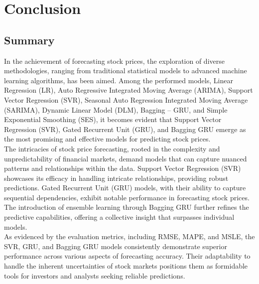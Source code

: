 \documentclass{ieeeojies}
\begin{document}
\section{Conclusion}
\subsection{Summary}
In the achievement of forecasting stock prices, the exploration of diverse methodologies, ranging from traditional statistical models to advanced machine learning algorithms, has been aimed. Among the performed models, Linear Regression (LR), Auto Regressive Integrated Moving Average (ARIMA), Support Vector Regression (SVR), Seasonal Auto Regression Integrated Moving Average (SARIMA), Dynamic Linear Model (DLM), Bagging – GRU, and Simple Exponential Smoothing (SES), it becomes evident that Support Vector Regression (SVR), Gated Recurrent Unit (GRU), and Bagging GRU emerge as the most promising and effective models for predicting stock prices.\\
The intricacies of stock price forecasting, rooted in the complexity and unpredictability of financial markets, demand models that can capture nuanced patterns and relationships within the data. Support Vector Regression (SVR) showcases its efficacy in handling intricate relationships, providing robust predictions. Gated Recurrent Unit (GRU) models, with their ability to capture sequential dependencies, exhibit notable performance in forecasting stock prices. The introduction of ensemble learning through Bagging GRU further refines the predictive capabilities, offering a collective insight that surpasses individual models.\\
As evidenced by the evaluation metrics, including RMSE, MAPE, and MSLE, the SVR, GRU, and Bagging GRU models consistently demonstrate superior performance across various aspects of forecasting accuracy. Their adaptability to handle the inherent uncertainties of stock markets positions them as formidable tools for investors and analysts seeking reliable predictions.
\end{document}
